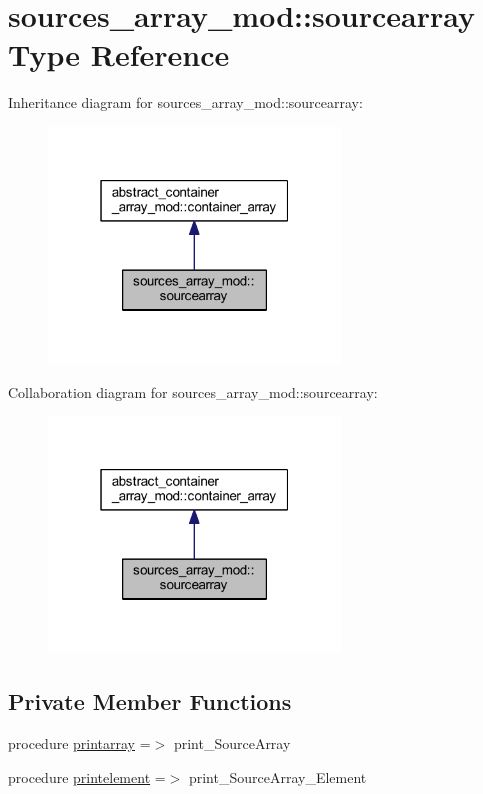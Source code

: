 \hypertarget{structsources__array__mod_1_1sourcearray}{}\section{sources\+\_\+array\+\_\+mod\+:\+:sourcearray Type Reference}
\label{structsources__array__mod_1_1sourcearray}


Inheritance diagram for sources\+\_\+array\+\_\+mod\+:\+:sourcearray\+:\nopagebreak
\begin{figure}[H]
\begin{center}
\leavevmode
\includegraphics[width=220pt]{structsources__array__mod_1_1sourcearray__inherit__graph}
\end{center}
\end{figure}


Collaboration diagram for sources\+\_\+array\+\_\+mod\+:\+:sourcearray\+:\nopagebreak
\begin{figure}[H]
\begin{center}
\leavevmode
\includegraphics[width=220pt]{structsources__array__mod_1_1sourcearray__coll__graph}
\end{center}
\end{figure}
\subsection*{Private Member Functions}
\begin{DoxyCompactItemize}
\item 
procedure \hyperlink{structsources__array__mod_1_1sourcearray_a4200722231b4dfefa4f096b235d911e6}{printarray} =$>$ print\+\_\+\+Source\+Array
\item 
procedure \hyperlink{structsources__array__mod_1_1sourcearray_a72a537b29e5b5cf3ba35745cb7b41524}{printelement} =$>$ print\+\_\+\+Source\+Array\+\_\+\+Element
\end{DoxyCompactItemize}


